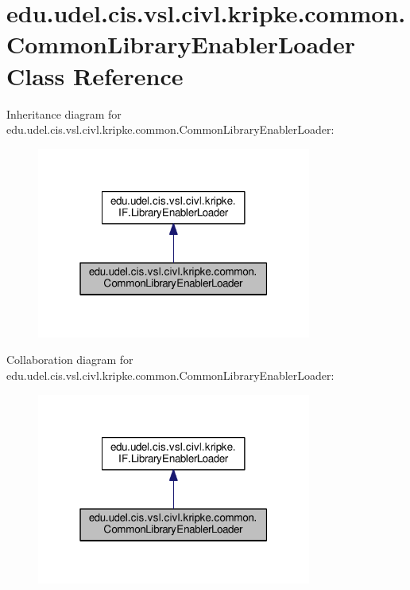\hypertarget{classedu_1_1udel_1_1cis_1_1vsl_1_1civl_1_1kripke_1_1common_1_1CommonLibraryEnablerLoader}{}\section{edu.\+udel.\+cis.\+vsl.\+civl.\+kripke.\+common.\+Common\+Library\+Enabler\+Loader Class Reference}
\label{classedu_1_1udel_1_1cis_1_1vsl_1_1civl_1_1kripke_1_1common_1_1CommonLibraryEnablerLoader}


Inheritance diagram for edu.\+udel.\+cis.\+vsl.\+civl.\+kripke.\+common.\+Common\+Library\+Enabler\+Loader\+:
\nopagebreak
\begin{figure}[H]
\begin{center}
\leavevmode
\includegraphics[width=256pt]{classedu_1_1udel_1_1cis_1_1vsl_1_1civl_1_1kripke_1_1common_1_1CommonLibraryEnablerLoader__inherit__graph}
\end{center}
\end{figure}


Collaboration diagram for edu.\+udel.\+cis.\+vsl.\+civl.\+kripke.\+common.\+Common\+Library\+Enabler\+Loader\+:
\nopagebreak
\begin{figure}[H]
\begin{center}
\leavevmode
\includegraphics[width=256pt]{classedu_1_1udel_1_1cis_1_1vsl_1_1civl_1_1kripke_1_1common_1_1CommonLibraryEnablerLoader__coll__graph}
\end{center}
\end{figure}
